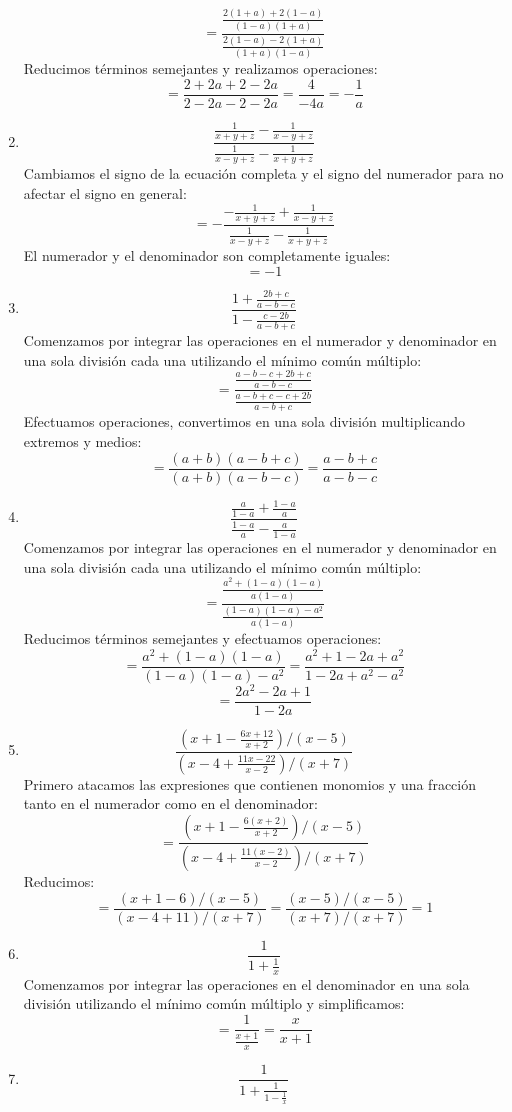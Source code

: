 \documentclass[12pt]{article}
\begin{document}
\begin{enumerate}[label=\bfseries Ejercicio \arabic*:]
$$= \frac{\frac{2(1 + a) + 2(1 - a)}{(1 - a)(1 + a)}}{\frac{2(1 - a) - 2(1 + a)}{(1 + a)(1 - a)}}$$
Reducimos términos semejantes y realizamos operaciones:
$$= \frac{2 + 2a + 2 - 2a}{2 - 2a - 2 - 2a} = \frac{4}{-4a} = - \frac{1}{a}$$
  \item $$\frac{\frac{1}{x + y + z} - \frac{1}{x - y + z}}{\frac{1}{x - y + z} - \frac{1}{x + y + z}}$$
Cambiamos el signo de la ecuación completa y el signo del numerador para no afectar el signo en general:
$$= - \frac{- \frac{1}{x + y + z} + \frac{1}{x - y + z}}{\frac{1}{x - y + z} - \frac{1}{x + y + z}}$$
El numerador y el denominador son completamente iguales:
$$= - 1$$
  \item $$\frac{1 + \frac{2b + c}{a - b - c}}{1 - \frac{c - 2b}{a - b + c}}$$
Comenzamos por integrar las operaciones en el numerador y denominador en una sola división cada una utilizando el mínimo común múltiplo:
$$= \frac{\frac{a - b- c + 2b + c}{a - b - c}}{\frac{a - b + c - c +2b}{a - b + c}}$$
Efectuamos operaciones, convertimos en una sola división multiplicando extremos y medios:
$$= \frac{(a + b)(a - b + c)}{(a + b)(a - b - c)} = \frac{a - b + c}{a - b - c}$$
  \item $$\frac{\frac{a}{1 - a} + \frac{1 - a}{a}}{\frac{1 - a}{a} - \frac{a}{1 - a}}$$
Comenzamos por integrar las operaciones en el numerador y denominador en una sola división cada una utilizando el mínimo común múltiplo:
$$= \frac{\frac{a^2 + (1 - a)(1 - a)}{a(1 - a)}}{\frac{(1 - a)(1 - a) - a^2}{a(1 - a)}}$$
Reducimos términos semejantes y efectuamos operaciones:
$$= \frac{a^2 + (1 - a)(1 - a)}{(1 - a)(1 - a) - a^2} = \frac{a^2 + 1 - 2a + a^2}{1 - 2a + a^2 - a^2}$$
$$= \frac{2a^2 - 2a + 1}{1 - 2a}$$
  \item $$\frac{\left( x + 1 - \frac{6x + 12}{x + 2} \right) / (x - 5)}{\left( x - 4 + \frac{11x - 22}{x - 2} \right) / (x + 7)}$$
Primero atacamos las expresiones que contienen monomios y una fracción tanto en el numerador como en el denominador:
$$= \frac{\left( x + 1 - \frac{6(x + 2)}{x + 2} \right) / (x - 5)}{\left( x - 4 + \frac{11(x - 2)}{x - 2} \right) / (x + 7)}$$
Reducimos:
$$= \frac{\left( x + 1 - 6 \right) / (x - 5)}{\left( x - 4 + 11 \right) / (x + 7)} = \frac{(x - 5) / (x - 5)}{(x + 7) / (x + 7)} = 1$$
  \item $$\frac{1}{1 + \frac{1}{x}}$$
Comenzamos por integrar las operaciones en el denominador en una sola división utilizando el mínimo común múltiplo y simplificamos:
$$= \frac{1}{\frac{x + 1}{x}} = \frac{x}{x + 1}$$
  \item $$\frac{1}{1 + \frac{1}{1 - \frac{1}{x}}}$$

\end{enumerate}
\end{document}
